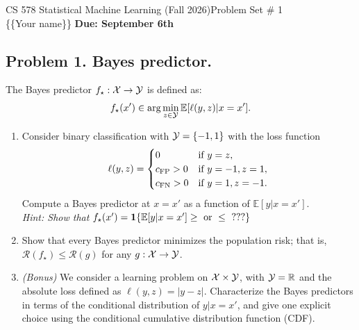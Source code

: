 \documentclass[12pt]{article}
\theoremstyle{plain}
\theoremstyle{definition}
\begin{document}
\noindent CS 578 Statistical Machine Learning (Fall 2026)\hfill Problem Set \# 1\\
\{\{Your name\}\} \hfill \textbf{Due: September 6th}

\noindent\hrulefill

\subsection*{Problem 1. Bayes predictor.}
The Bayes predictor $f_{\star}:{\cal X}\rightarrow {\cal Y}$ is defined as:
\begin{align*}
    f_{\star}(x')\in \arg \min_{z\in {\cal Y}} \mathbb{E}[\ell(y,z)|x=x'].
\end{align*}
\begin{enumerate}
    \item Consider binary classification with ${\cal Y} = \{-1, 1\}$ with the loss function 
        \begin{align*}
            \ell(y,z)=\begin{cases}
            0 & \text{if}~y=z,\\
            c_{\rm FP}>0 & \text{if}~y=-1,z=1,\\
            c_{\rm FN} > 0 & \text{if}~y=1,z=-1.
            \end{cases}
        \end{align*}
    Compute a Bayes predictor at $x=x'$ as a function of $\mathbb{E}[y|x=x']$.\\
    \textit{Hint: Show that $f_\star(x') = {\bf 1}\{\mathbb{E}[y|x=x'] \geq~\text{or }\leq~\text{???}\}$}
    \item Show that every Bayes predictor minimizes the population risk; that is, $\mathcal{R}(f_\star)\leq \mathcal{R}(g)$ for any $g:{\cal X}\rightarrow {\cal Y}$.
    \item \emph{(Bonus)} We consider a learning problem on ${\cal X} \times {\cal Y}$, with ${\cal Y} = \mathbb{R}$ and the absolute loss defined as $\ell(y, z) = |y - z|$. Characterize the Bayes predictors in terms of the conditional distribution of $y|x=x'$, and give one explicit choice using the conditional cumulative distribution function (CDF).
\end{enumerate}
\newline 
\   %
\newpage
\end{document}
